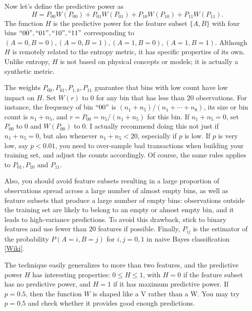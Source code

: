 \documentclass[oneside,10pt]{book}
\begin{document}
\noindent Now let’s define the \textcolor{index}{predictive power} as
$$
H = P_{00} W(P_{00}) + P_{01} W(P_{01}) + P_{10} W(P_{10}) + P_{11} W(P_{11}).
$$
The function $H$ is the predictive power for the feature subset $\{A, B\}$ with four bins $``00", ``01", ``10", ``11"$ corresponding to
$(A = 0, B = 0), (A = 0, B = 1), (A = 1, B = 0), (A = 1, B = 1)$. Although $H$ is remotely related to the
\textcolor{index}{entropy metric}, it has specific properties of its own. Unlike entropy, $H$ is not based on physical concepts or models; it is actually a \textcolor{index}{synthetic metric}.


The weights $P_{00},P_{01},P_{1,0},P_{11}$  guarantee that bins with low count  have low impact on $H$. Set $W(r)$ to $0$ for any bin that has less than $20$ observations.
For instance, the frequency of bin $``00"$ is $(n_1 + n_5) / (n_1 +\cdots + n_8)$, its size or bin count is $n_1 + n_5$, and
$r = P_{00} = n_5 / (n_1 + n_5)$ for this bin. If $n_1 + n_5 = 0$, set $P_{00}$ to $0$ and $W(P_{00})$ to 0.
I actually recommend doing this not just if $n_1 + n_5 = 0$, but also whenever $n_1 + n_5 < 20$, especially if $p$ is low. If $p$ is very low, say $p < 0.01$, you need to over-sample bad transactions when building your training set, and adjust the counts accordingly.
Of course, the same rules applies to $P_{01}, P_{10}$ and $P_{11}$.

Also, you should avoid feature subsets resulting in a large proportion of observations spread across a large number of almost empty bins, as well as feature subsets that produce a large number of empty bins: observations outside the training set are likely to belong to an empty or almost empty bin, and it leads to high-variance predictions. To avoid this drawback, stick to binary features and use fewer than $20$ features if possible.
Finally, $P_{ij}$  is the estimator of the probability $P(A = i, B = j)$ for $i, j = 0,1$ in
\textcolor{index}{naive Bayes classification} [\href{https://en.wikipedia.org/wiki/Naive_Bayes_classifier}{Wiki}].


The technique easily generalizes to more than two features, and the predictive power $H$ has interesting properties: $0\leq H\leq 1$, with $H= 0$ if the feature subset has no predictive power, and $H=1$ if it has maximum predictive power. If  $p = 0.5$, then the function $W$ is shaped like a V rather than a W. You may try $p=0.5$ and check whether it provides good enough predictions.
\end{document}
